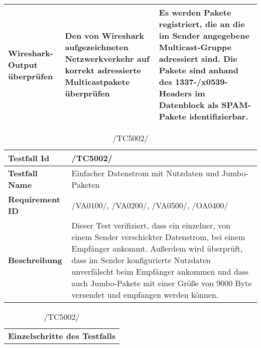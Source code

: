\begin{table}[h]
\begin{center}
\begin{tabular}{|p{3.5cm}|p{5cm}|p{6.55cm}|}
                \hline
                    Wireshark-Output überprüfen &
                    Den von Wireshark aufgezeichneten Netzwerkverkehr auf
                    korrekt adressierte Multicastpakete überprüfen &
                    Es werden Pakete registriert, die an die im Sender
                    angegebene Multicast-Gruppe adressiert sind. Die Pakete
                    sind anhand des 1337-/x0539-Headers im Datenblock als
                    SPAM-Pakete identifizierbar.\\
                \hline
            \end{tabular}
        \end{center}
    \end{table}

    \begin{table}[h]
        \caption{/TC5002/}
        \label{tab:TC5002}
        \begin{center}
            \begin{tabular}{|p{3.5cm}|p{12cm}|}
                \hline
                    \textbf{Testfall Id} & /TC5002/\\
                \hline
                    \textbf{Testfall Name} & Einfacher Datenstrom mit
                                             Nutzdaten und Jumbo-Paketen\\
                \hline
                    \textbf{Requirement ID} & /VA0100/, /VA0200/, /VA0500/,
                    /OA0400/\\
                \hline
                    \textbf{Beschreibung} & Dieser Test verifiziert, dass ein
                                            einzelner, von einem Sender
                                            verschickter Datenstrom, bei einem
                                            Empfänger ankommt. Außerdem wird
                                            überprüft, dass im Sender
                                            konfigurierte Nutzdaten
                                            unverfälscht beim Empfänger
                                            ankommen und dass auch
                                            Jumbo-Pakete mit einer Größe von
                                            9000 Byte versendet und empfangen
                                            werden können.\\
                \hline
            \end{tabular}
            \begin{tabular}{|p{3.5cm}|p{5cm}|p{6.55cm}|}
                \multicolumn{3}{|c|}{\textbf{Einzelschritte des Testfalls}} \\

\end{tabular}
\end{center}
\end{table}
